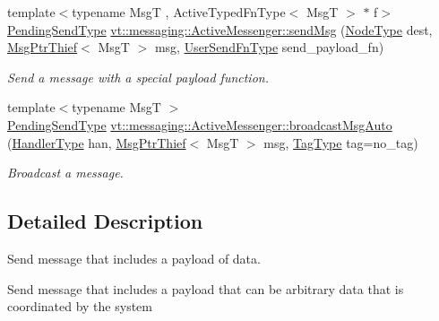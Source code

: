 \begin{DoxyCompactItemize}
{\footnotesize template$<$typename MsgT , Active\+Typed\+Fn\+Type$<$ Msg\+T $>$ $\ast$ f$>$ }\\\hyperlink{structvt_1_1messaging_1_1_active_messenger_a3626a6ca76d8ad4ec7c3b47a2c70d3a8}{Pending\+Send\+Type} \hyperlink{group__sendpayload_ga11c4c7dec9f0da88060bacff76fb118d}{vt\+::messaging\+::\+Active\+Messenger\+::send\+Msg} (\hyperlink{namespacevt_a866da9d0efc19c0a1ce79e9e492f47e2}{Node\+Type} dest, \hyperlink{structvt_1_1messaging_1_1_msg_ptr_thief}{Msg\+Ptr\+Thief}$<$ MsgT $>$ msg, \hyperlink{structvt_1_1messaging_1_1_active_messenger_a4b1993ad77436b6ed6c7fd32801c50ed}{User\+Send\+Fn\+Type} send\+\_\+payload\+\_\+fn)
\begin{DoxyCompactList}\small\item\em Send a message with a special payload function. \end{DoxyCompactList}\item 
{\footnotesize template$<$typename MsgT $>$ }\\\hyperlink{structvt_1_1messaging_1_1_active_messenger_a3626a6ca76d8ad4ec7c3b47a2c70d3a8}{Pending\+Send\+Type} \hyperlink{group__sendpayload_gab11ebaa792d7b87397773347626ad4f9}{vt\+::messaging\+::\+Active\+Messenger\+::broadcast\+Msg\+Auto} (\hyperlink{namespacevt_af64846b57dfcaf104da3ef6967917573}{Handler\+Type} han, \hyperlink{structvt_1_1messaging_1_1_msg_ptr_thief}{Msg\+Ptr\+Thief}$<$ MsgT $>$ msg, \hyperlink{namespacevt_a84ab281dae04a52a4b243d6bf62d0e52}{Tag\+Type} tag=no\+\_\+tag)
\begin{DoxyCompactList}\small\item\em Broadcast a message. \end{DoxyCompactList}\end{DoxyCompactItemize}


\subsection{Detailed Description}
Send message that includes a payload of data. 

Send message that includes a payload that can be arbitrary data that is coordinated by the system


